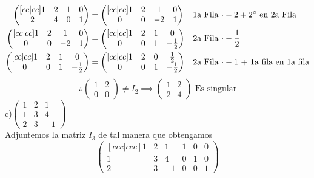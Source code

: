 \documentclass[letterpaper]{article}
\renewcommand{\*}{\cdot}
\theoremstyle{definition}
\begin{document}
	\begin{align*}
		\begin{pmatrix}[cc|cc]
		1 & 2 & 1 & 0 \\
		2 & 4 & 0 & 1 \\
		\end{pmatrix} & = \begin{pmatrix}[cc|cc]
		1 & 2 & 1 & 0 \\
		0 & 0 & -2 & 1 \\
		\end{pmatrix} && \text{1a Fila $ \* -2  + 2^a$ en 2a Fila}\\
		\begin{pmatrix}[cc|cc]
		1 & 2 & 1 & 0 \\
		0 & 0 & -2 & 1 \\
		\end{pmatrix} & = \begin{pmatrix}[cc|cc]
		1 & 2 & 1 & 0 \\
		0 & 0 & 1 & -\frac{1}{2} \\
		\end{pmatrix} && \text{2a Fila $ \* - \dfrac{1}{2} $}\\
		\begin{pmatrix}[cc|cc]
		1 & 2 & 1 & 0 \\
		0 & 0 & 1 & -\frac{1}{2} \\
		\end{pmatrix} & = \begin{pmatrix}[cc|cc]
		1 & 2 & 0 & \frac{1}{2} \\
		0 & 0 & 1 & -\frac{1}{2} \\
		\end{pmatrix} && \text{2a Fila $ \* -1 $ + 1a fila en 1a fila}
	\end{align*}
	\[ \therefore \begin{pmatrix}
	1 & 2 \\
	0 & 0 
	\end{pmatrix} \neq I_2 \implies \begin{pmatrix}
	1 & 2 \\
	2 & 4 
	\end{pmatrix} \text{ Es singular} \]
	c)$\begin{pmatrix} 1 & 2 & 1 \\ 1 & 3 & 4 \\ 2 & 3 & -1 \end{pmatrix}$\\
	Adjuntemos la matriz $ I_3 $ de tal manera que obtengamos
	\[\begin{pmatrix}[ccc|ccc]
	1 & 2 & 1 & 1 & 0 & 0\\
	1 & 3 & 4 & 0 & 1 & 0\\
	2 & 3 & -1 & 0 & 0 & 1
	\end{pmatrix}\]
\end{document}
